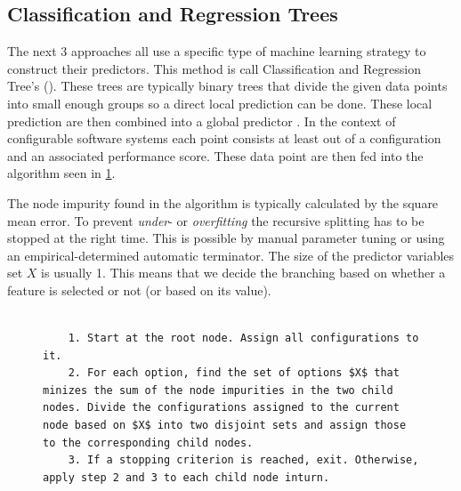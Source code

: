 \subsection{Classification and Regression Trees}
\label{sec:CART}
The next 3 approaches all use a specific type of machine learning strategy to construct their predictors. This method is call Classification and Regression Tree's (\CART). These trees are typically binary trees that divide the given data points into small enough groups so a direct local prediction can be done. These local prediction are then combined into a global predictor \cite{VariabilityAwarePerformancePredictionJianmeiSigmundApel}. In the context of configurable software systems each point consists at least out of a configuration and an associated performance score. These data point are then fed into the algorithm seen in \cref{alg:CART}.


The node impurity found in the algorithm is typically calculated by the square mean error. To prevent \textit{under}- or \textit{overfitting}\cite{ElementsOfStatisticalLearning} the recursive splitting has to be stopped at the right time. This is possible by manual parameter tuning or using an empirical-determined automatic terminator. The size of the predictor variables set $X$ is usually 1. This means that we decide the branching based on whether a feature is selected or not (or based on its value).
\\\\
\begin{figure}[t]
	\lstset{
		mathescape,
		breaklines=true,
	}
	\begin{lstlisting}
	1. Start at the root node. Assign all configurations to it.
	2. For each option, find the set of options $X$ that minizes the sum of the node impurities in the two child nodes. Divide the configurations assigned to the current node based on $X$ into two disjoint sets and assign those to the corresponding child nodes.
	3. If a stopping criterion is reached, exit. Otherwise, apply step 2 and 3 to each child node inturn.
	\end{lstlisting}
	\label{alg:CART}
\end{figure}

